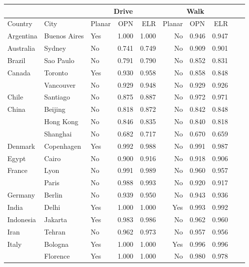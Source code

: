 \begin{tabular}{ l l l r r r l r r r }
\toprule
             &               & \multicolumn{3}{|c|}{Drive}         & \multicolumn{3}{c}{Walk}            \\
\midrule
Country      & City          &  Planar  &  OPN   &  ELR   &  Planar  &  OPN   &  ELR   \\
\midrule
Argentina & Buenos Aires &      Yes &  1.000 &  1.000 &       No &  0.946 &  0.947 \\
Australia & Sydney &       No &  0.741 &  0.749 &       No &  0.909 &  0.901 \\
Brazil & Sao Paulo &       No &  0.791 &  0.790 &       No &  0.852 &  0.831 \\
Canada & Toronto &      Yes &  0.930 &  0.958 &       No &  0.858 &  0.848 \\
          & Vancouver &       No &  0.929 &  0.948 &       No &  0.929 &  0.926 \\
Chile & Santiago &       No &  0.875 &  0.887 &       No &  0.972 &  0.971 \\
China & Beijing &       No &  0.818 &  0.872 &       No &  0.842 &  0.848 \\
          & Hong Kong &       No &  0.846 &  0.835 &       No &  0.840 &  0.818 \\
          & Shanghai &       No &  0.682 &  0.717 &       No &  0.670 &  0.659 \\
Denmark & Copenhagen &      Yes &  0.992 &  0.988 &       No &  0.991 &  0.987 \\
Egypt & Cairo &       No &  0.900 &  0.916 &       No &  0.918 &  0.906 \\
France & Lyon &       No &  0.991 &  0.989 &       No &  0.960 &  0.957 \\
          & Paris &       No &  0.988 &  0.993 &       No &  0.920 &  0.917 \\
Germany & Berlin &       No &  0.939 &  0.950 &       No &  0.943 &  0.936 \\
India & Delhi &      Yes &  1.000 &  1.000 &      Yes &  0.993 &  0.992 \\
Indonesia & Jakarta &      Yes &  0.983 &  0.986 &       No &  0.962 &  0.960 \\
Iran & Tehran &       No &  0.962 &  0.973 &       No &  0.957 &  0.956 \\
Italy & Bologna &      Yes &  1.000 &  1.000 &      Yes &  0.996 &  0.996 \\
          & Florence &      Yes &  1.000 &  1.000 &       No &  0.980 &  0.978 \\

\end{tabular}
